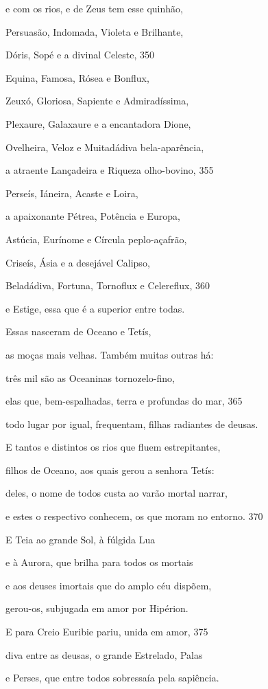 e com os rios, e de Zeus tem esse quinhão,

Persuasão, Indomada, Violeta e Brilhante,

Dóris, Sopé e a divinal Celeste, \num{350}

Equina, Famosa, Rósea e Bonflux,

Zeuxó, Gloriosa, Sapiente e Admiradíssima,

Plexaure, Galaxaure e a encantadora Dione,

Ovelheira, Veloz e Muitadádiva bela-aparência,

a atraente Lançadeira e Riqueza olho-bovino, \num{355}

Perseís, Iáneira, Acaste e Loira,

a apaixonante Pétrea, Potência e Europa,

Astúcia, Eurínome e Círcula peplo-açafrão,

Criseís, Ásia e a desejável Calipso,

Beladádiva, Fortuna, Tornoflux e Celereflux, \num{360}

e Estige, essa que é a superior entre todas.

Essas nasceram de Oceano e Tetís,

as moças mais velhas. Também muitas outras há:

três mil são as Oceaninas tornozelo-fino,

elas que, bem-espalhadas, terra e profundas do mar, \num{365}

todo lugar por igual, frequentam, filhas radiantes de deusas.

E tantos e distintos os rios que fluem estrepitantes,

filhos de Oceano, aos quais gerou a senhora Tetís:

deles, o nome de todos custa ao varão mortal narrar,

e estes o respectivo conhecem, os que moram no entorno. \num{370}

\quad{}E Teia ao grande Sol, à fúlgida Lua

e à Aurora, que brilha para todos os mortais

e aos deuses imortais que do amplo céu dispõem,

gerou-os, subjugada em amor por Hipérion.

E para Creio Euribie pariu, unida em amor, \num{375}

diva entre as deusas, o grande Estrelado, Palas

e Perses, que entre todos sobressaía pela sapiência.

